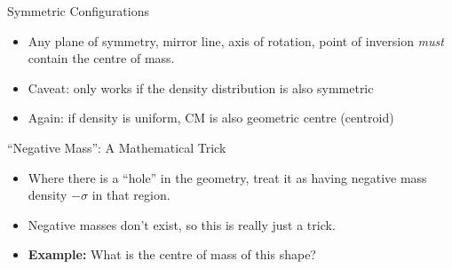 \documentclass[12pt,compress,aspectratio=169]{beamer}
\begin{document}
\begin{frame}{Symmetric Configurations}
  \begin{itemize}
  \item Any plane of symmetry, mirror line, axis of rotation, point of inversion
    \emph{must} contain the centre of mass.
  \item Caveat: only works if the density distribution is also symmetric
  \item Again: if density is uniform, CM is also geometric centre (centroid)
  \end{itemize}
\end{frame}



\begin{frame}{``Negative Mass'': A Mathematical Trick}
  \begin{itemize}
  \item Where there is a ``hole'' in the geometry, treat it as having negative
    mass density $-\sigma$ in that region.
  \item Negative masses don't exist, so this is really just a trick.
  \item\textbf{Example:} What is the centre of mass of this shape?
    \begin{center}
    \end{center}
  \end{itemize}
\end{frame}
\end{document}
